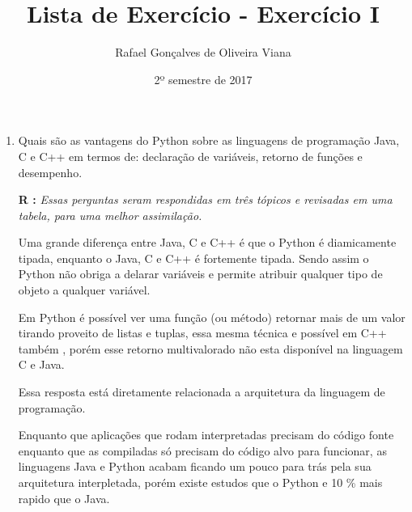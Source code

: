 \documentclass[12pt]{article}
\title{Lista de Exercício  - Exercício I }
\author{Rafael Gonçalves de  Oliveira Viana}
\date{2º semestre de 2017}
\begin{document}
\maketitle

\begin{enumerate}
\item
Quais são as vantagens do Python sobre as linguagens de programação Java, C e C++
em termos de: declaração de variáveis, retorno de funções e desempenho.


\textbf{R :}\textit{
	Essas perguntas seram respondidas em três tópicos e revisadas em uma tabela, para uma melhor assimilação.}
	
	
	 Uma grande diferença entre Java, C e C++ é que o Python é diamicamente tipada, enquanto o Java, C e C++ é fortemente tipada. Sendo assim o Python não obriga a delarar variáveis e permite atribuir qualquer tipo de objeto a qualquer variável.
	 
		 
	Em Python é possível ver uma função (ou método) retornar mais de um valor tirando proveito de listas e tuplas, essa mesma técnica e possível em C++ também , porém esse retorno multivalorado não esta disponível na linguagem C e Java.
	 
	 Essa resposta está diretamente relacionada a arquitetura da linguagem de programação.
	 
	 Enquanto que aplicações que rodam interpretadas precisam do código fonte enquanto que as compiladas só precisam do código alvo para funcionar, as linguagens Java e Python acabam ficando um pouco para trás pela sua arquitetura interpletada, porém existe estudos que o Python e 10 \% mais rapido que o Java. 
	 

\end{enumerate}
\end{document}
